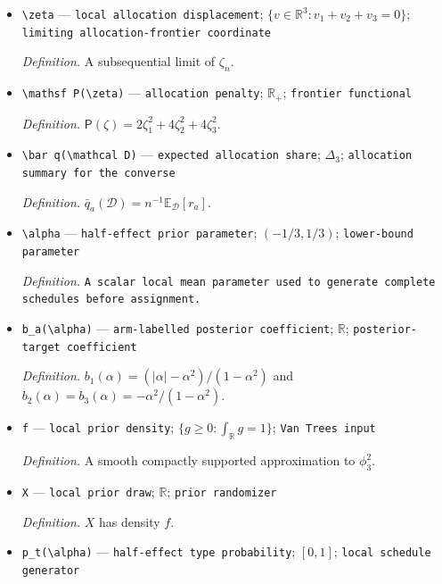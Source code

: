 \documentclass{article}
\begin{document}
\begin{itemize}
  \par\smallskip\noindent\emph{Definition.} \(\zeta_n=n^{1/6}(q_n-q^\star)\).
  \item \texttt{\textbackslash{}\allowbreak{}zeta} --- \texttt{local allocation displacement}; \(\{v\in\mathbb R^3:v_1+v_2+v_3=0\}\); \texttt{limiting allocation-\allowbreak{}frontier coordinate}
  \par\smallskip\noindent\emph{Definition.} A subsequential limit of \(\zeta_n\).
  \item \texttt{\textbackslash{}\allowbreak{}mathsf P(\textbackslash{}\allowbreak{}zeta)} --- \texttt{allocation penalty}; \(\mathbb R_+\); \texttt{frontier functional}
  \par\smallskip\noindent\emph{Definition.} \(\mathsf P(\zeta)=2\zeta_1^2+4\zeta_2^2+4\zeta_3^2\).
  \item \texttt{\textbackslash{}\allowbreak{}bar q(\textbackslash{}\allowbreak{}mathcal D)} --- \texttt{expected allocation share}; \(\Delta_3\); \texttt{allocation summary for the converse}
  \par\smallskip\noindent\emph{Definition.} \(\bar q_a(\mathcal D)=n^{-1}\mathbb E_{\mathcal D}[r_a]\).
  \item \texttt{\textbackslash{}\allowbreak{}alpha} --- \texttt{half-\allowbreak{}effect prior parameter}; \((-1/3,1/3)\); \texttt{lower-\allowbreak{}bound parameter}
  \par\smallskip\noindent\emph{Definition.} \texttt{A scalar local mean parameter used to generate complete schedules before assignment.}
  \item \texttt{b\_\allowbreak{}a(\textbackslash{}\allowbreak{}alpha)} --- \texttt{arm-\allowbreak{}labelled posterior coefficient}; \(\mathbb R\); \texttt{posterior-\allowbreak{}target coefficient}
  \par\smallskip\noindent\emph{Definition.} \(b_1(\alpha)=(|\alpha|-\alpha^2)/(1-\alpha^2)\) and \(b_2(\alpha)=b_3(\alpha)=-\alpha^2/(1-\alpha^2)\).
  \item \texttt{f} --- \texttt{local prior density}; \(\{g\ge0:\int_{\mathbb R}g=1\}\); \texttt{Van Trees input}
  \par\smallskip\noindent\emph{Definition.} A smooth compactly supported approximation to \(\phi_3^2\).
  \item \texttt{X} --- \texttt{local prior draw}; \(\mathbb R\); \texttt{prior randomizer}
  \par\smallskip\noindent\emph{Definition.} \(X\) has density \(f\).
  \item \texttt{p\_\allowbreak{}t(\textbackslash{}\allowbreak{}alpha)} --- \texttt{half-\allowbreak{}effect type probability}; \([0,1]\); \texttt{local schedule generator}

\end{itemize}
\end{document}
